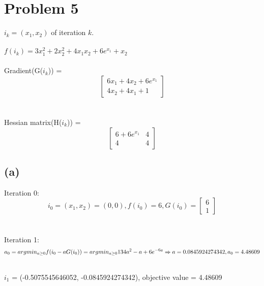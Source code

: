 \documentclass{article}
\begin{document}
\newpage
\section{Problem 5}
$i_k = (x_1, x_2)$ of iteration $k$.
\\
\\$f(i_k) = 3x_1^2 + 2x_2^2 +  4 x_1 x_2 + 6e^{x_1} + x_2$
\\
\\Gradient(G($i_k$)) =
$$\begin{bmatrix}
6x_1 + 4x_2 + 6e^{x_1}\\
4x_2 + 4x_1 + 1
\end{bmatrix}$$
\\
\\Hessian matrix(H($i_k$)) =
$$\begin{bmatrix}
6 + 6e^{x_1} & 4\\
4 & 4
\end{bmatrix}$$

\subsection{(a)}
Iteration 0:
\begin{equation*}
i_0 = (x_1, x_2) = (0, 0), f(i_0) = 6, G(i_0) = 
\begin{bmatrix}
6 \\
1
\end{bmatrix}
\end{equation*}
\\
\\Iteration 1:
\begin{equation*}
a_0 = argmin_{a \geq 0}f(i_0 - aG(i_0)) = argmin_{a \geq 0}134a^2 - a + 6e^{-6a}\\
\xRightarrow{} a = 0.0845924274342, a_0 = 4.48609
\end{equation*}
\\$i_1$ = (-0.5075545646052, -0.0845924274342), objective value = 4.48609
\end{document}

